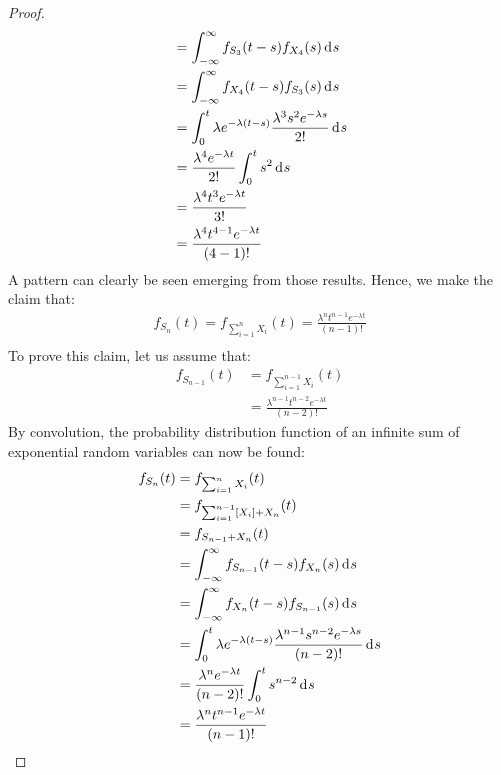 \documentclass[12pt]{article}
\begin{document}
\begin{proof}
\begin{equation}
\begin{split}
									&=	\int^\infty_{-\infty} f_{S_3}(t-s)f_{X_4}(s)\mathop{}\!\mathrm{d^{}}s\\
									&=	\int^\infty_{-\infty} f_{X_4}(t-s)f_{S_3}(s)\mathop{}\!\mathrm{d^{}}s\\
									&=	\int^t_0 \lambda e^{-\lambda(t-s)}\frac{\lambda^3 s^2 e^{-\lambda s}}{2!}\mathop{}\!\mathrm{d^{}}s\\
									&=	\frac{\lambda^4 e^{-\lambda t}}{2!}\int^t_0 s^2\mathop{}\!\mathrm{d^{}}s\\
									&=	\frac{\lambda^4 t^3 e^{-\lambda t}}{3!}\\
									&=	\frac{\lambda^4 t^{4-1} e^{-\lambda t}}{(4-1)!}\\
		\end{split}
	\end{equation}
	A pattern can clearly be seen emerging from those results. Hence, we make the claim that:
	\begin{equation}
		\begin{split}
			f_{S_n}(t) = f_{\sum^n_{i=1}X_i}(t) = \frac{\lambda^n t^{n-1} e^{-\lambda t}}{(n-1)!}\\
		\end{split}
	\end{equation}
	To prove this claim, let us assume that:
	\begin{equation}
		\begin{split}
			f_{S_{n-1}}(t)	&=	f_{\sum^{n-1}_{i=1}X_i} (t)\\
							&=	\frac{\lambda^{n-1} t^{n-2} e^{-\lambda t}}{(n-2)!}
		\end{split}
	\end{equation}
	By convolution, the probability distribution function of an infinite sum of exponential random variables can now be
	found:
	\begin{equation}
		\begin{split}
			f_{S_n}(t)	&=	f_{\sum^n_{i=1}X_i}(t)\\
						&=	f_{\sum^{n-1}_{i=1}[X_i] + X_n }(t)\\
						&=	f_{S_{n-1} + X_n }(t)\\
						&=	\int^\infty_{-\infty} f_{S_{n-1}}(t-s)f_{X_n}(s)\diff{s}\\
						&=	\int^\infty_{-\infty} f_{X_n}(t-s)f_{S_{n-1}}(s)\diff{s}\\
						&=	\int^t_0 \lambda e^{-\lambda(t-s)}\frac{\lambda^{n-1} s^{n-2} e^{-\lambda s}}{(n-2)!}\diff{s}\\
						&=	\frac{\lambda^n e^{-\lambda t}}{(n-2)!} \int^t_0 s^{n-2}\diff{s}\\
						&=	\frac{\lambda^n t^{n-1} e^{-\lambda t}}{(n-1)!}\\

\end{split}
\end{equation}
\end{proof}
\end{document}
